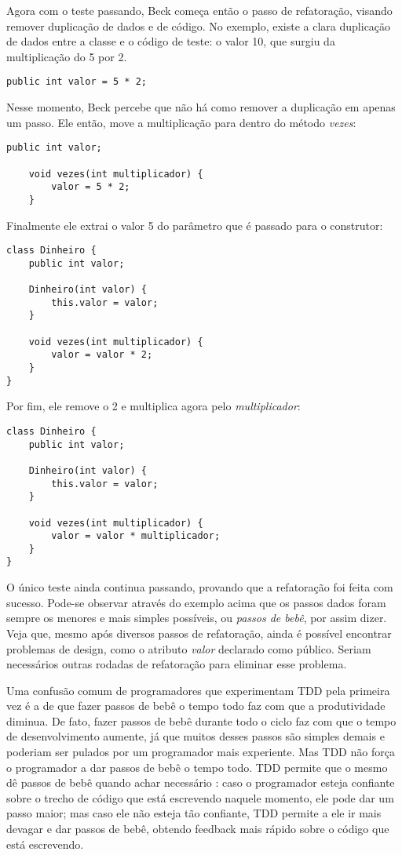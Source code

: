 Agora com o teste passando, Beck começa então o passo de refatoração, visando remover duplicação de dados e de código. No exemplo,
existe a clara duplicação de dados entre a classe e o código de teste: o valor 10, que surgiu da multiplicação do 5 por 2. 

\begin{lstlisting}[frame=trbl]
	public int valor = 5 * 2;
\end{lstlisting}

Nesse momento, Beck percebe que não há como remover a duplicação em apenas um passo. Ele então, move a multiplicação para dentro
do método \textit{vezes}:

\begin{lstlisting}[frame=trbl]
	public int valor;
	
	void vezes(int multiplicador) {
		valor = 5 * 2;
	}
\end{lstlisting}

Finalmente ele extrai o valor 5 do parâmetro que é passado para o construtor:

\begin{lstlisting}[frame=trbl]
class Dinheiro {
	public int valor;
	
	Dinheiro(int valor) {
		this.valor = valor;
	}
	
	void vezes(int multiplicador) {
		valor = valor * 2;
	}
}
\end{lstlisting}

Por fim, ele remove o 2 e multiplica agora pelo \textit{multiplicador}:

\begin{lstlisting}[frame=trbl]
class Dinheiro {
	public int valor;
	
	Dinheiro(int valor) {
		this.valor = valor;
	}
	
	void vezes(int multiplicador) {
		valor = valor * multiplicador;
	}
}
\end{lstlisting}

O único teste ainda continua passando, provando que a refatoração foi feita com sucesso. Pode-se observar através
do exemplo acima que os passos dados foram sempre os menores e mais simples possíveis, ou \textit{passos de bebê}, por assim dizer. 
Veja que, mesmo após diversos passos de refatoração, ainda é possível encontrar problemas de design, como o atributo \textit{valor}
declarado como público. Seriam necessários outras rodadas de refatoração para eliminar esse problema.

Uma confusão comum de programadores que experimentam TDD pela primeira vez é a de que fazer passos de bebê o tempo todo faz
com que a produtividade diminua. De fato, fazer passos de bebê durante todo o ciclo faz com que o tempo de desenvolvimento aumente,
já que muitos desses passos são simples demais e poderiam ser pulados por um programador mais experiente. Mas TDD não força o programador
a dar passos de bebê o tempo todo. TDD permite que o mesmo dê passos de bebê quando achar necessário \cite{TDDByExample}: caso
o programador esteja confiante sobre o trecho de código que está escrevendo naquele momento, ele pode dar um passo maior; mas caso ele
não esteja tão confiante, TDD permite a ele ir mais devagar e dar passos de bebê, obtendo feedback mais rápido sobre o código que está escrevendo. 


